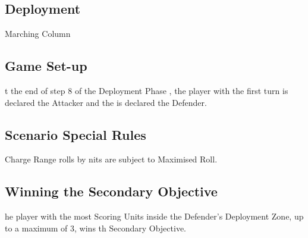 
\label{HoldTheLine}


\subsection*{Deployment}

 Marching Column


\subsection*{Game Set-up}

t the end of step 8 of the Deployment Phase , the player with the first turn is declared the Attacker and the is declared the Defender. 

\subsection*{Scenario Special Rules}

Charge Range rolls  by nits are subject to Maximised Roll.

\subsection*{Winning the Secondary Objective}

he player with the most Scoring Units inside the Defender's Deployment Zone, up to a maximum of 3, wins th Secondary Objective.

